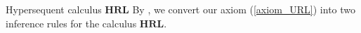 \documentclass[professionalfont, handout, 12pt]{beamer} %
\theoremstyle{plain}
\theoremstyle{definition}
\newcommand{\m}[1]{{\mathbf {#1} }}
\begin{document}
\begin{frame}{Hypersequent calculus $\m {HRL}$}
    By \cite{ciabattoni2017algebraic}, we convert our axiom (\ref{axiom_URL}) into two inference rules for the calculus $\m {HRL}$.
    \vspace{30pt}

    \begin{center}
    \vspace{30pt}
        
    \end{center}
    
\end{frame}



\end{document}
